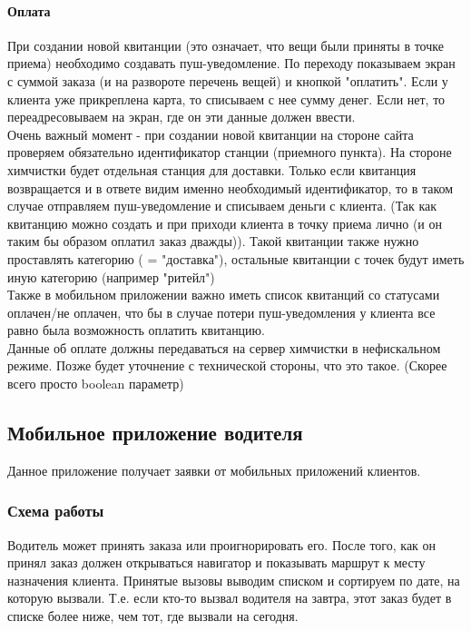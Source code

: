 \documentclass[DIV=calc, paper=a4, fontsize=11pt]{scrartcl} %
\begin{document}
\paragraph{Оплата}
При создании новой квитанции (это означает, что вещи были приняты в точке приема) необходимо создавать пуш-уведомление. По переходу показываем экран с суммой заказа (и на развороте перечень вещей) и кнопкой "оплатить". Если у клиента уже прикреплена карта, то списываем с нее сумму денег. Если нет, то переадресовываем на экран, где он эти данные должен ввести.
\\[0.5cm]
Очень важный момент - при создании новой квитанции на стороне сайта проверяем обязательно идентификатор станции (приемного пункта). На стороне химчистки будет отдельная станция для доставки. Только если квитанция возвращается и в ответе видим именно необходимый идентификатор, то в таком случае отправляем пуш-уведомление и списываем деньги с клиента. (Так как квитанцию можно создать и при приходи клиента в точку приема лично (и он таким бы образом оплатил заказ дважды)). Такой квитанции также нужно проставлять категорию ( = "доставка"), остальные квитанции с точек будут иметь иную категорию (например "ритейл")
\\[0.5cm]
Также в мобильном приложении важно иметь список квитанций со статусами оплачен/не оплачен, что бы в случае потери пуш-уведомления у клиента все равно была возможность оплатить квитанцию.
\\[0.5cm]
Данные об оплате должны передаваться на сервер химчистки в нефискальном режиме. Позже будет уточнение с технической стороны, что это такое. (Скорее всего просто boolean параметр)

\subsection{Мобильное приложение водителя}
Данное приложение получает заявки от мобильных приложений клиентов. 

\subsubsection{Схема работы}
Водитель может принять заказа или проигнорировать его. После того, как он принял заказ должен открываться навигатор и показывать маршрут к месту назначения клиента. Принятые вызовы выводим списком и сортируем по дате, на которую вызвали. Т.е. если кто-то вызвал водителя на завтра, этот заказ будет в списке более ниже, чем тот, где вызвали на сегодня.
\end{document}
